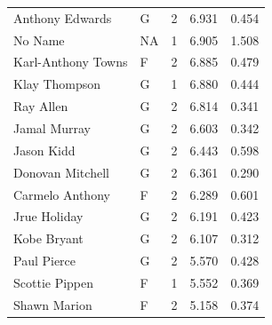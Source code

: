 \begin{table}[t]
\begin{tabular*}{\linewidth}{@{\extracolsep{\fill}}llcrr}
Anthony Edwards & G & 2 & 6.931 & 0.454 \\ 
No Name & NA & 1 & 6.905 & 1.508 \\ 
Karl-Anthony Towns & F & 2 & 6.885 & 0.479 \\ 
Klay Thompson & G & 1 & 6.880 & 0.444 \\ 
Ray Allen & G & 2 & 6.814 & 0.341 \\ 
Jamal Murray & G & 2 & 6.603 & 0.342 \\ 
Jason Kidd & G & 2 & 6.443 & 0.598 \\ 
Donovan Mitchell & G & 2 & 6.361 & 0.290 \\ 
Carmelo Anthony & F & 2 & 6.289 & 0.601 \\ 
Jrue Holiday & G & 2 & 6.191 & 0.423 \\ 
Kobe Bryant & G & 2 & 6.107 & 0.312 \\ 
Paul Pierce & G & 2 & 5.570 & 0.428 \\ 
Scottie Pippen & F & 1 & 5.552 & 0.369 \\ 
Shawn Marion & F & 2 & 5.158 & 0.374 \\ 
\bottomrule
\end{tabular*}
\end{table}

